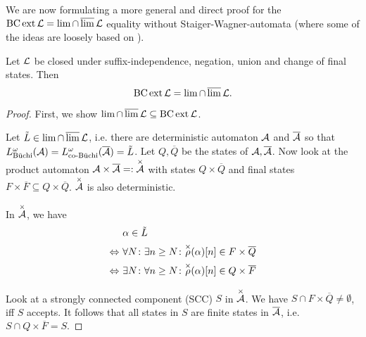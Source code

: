 We are now formulating a more general and direct proof for the $\operatorname{BC} \operatorname{ext} \mathcal{L} = \lim \cap \operatorname{\overline{lim}} \mathcal{L}$ equality without Staiger-Wagner-automata (where some of the ideas are loosely based on \cite[Theorem 63+64, p.44]{InfCompR101}).

\begin{lemma}
\label{gen:staiger-wagner}
Let $\mathcal{L}$ be closed under suffix-independence, negation, union and change of final states. Then
\[ \operatorname{BC} \operatorname{ext} \mathcal{L} = \lim \cap \operatorname{\overline{lim}} \mathcal{L} . \]

\begin{proof}
First, we show $\lim \cap \operatorname{\overline{lim}} \mathcal{L} \subseteq \operatorname{BC} \operatorname{ext} \mathcal{L}$.

Let $\tilde L \in \lim \cap \operatorname{\overline{lim}} \mathcal{L}$, i.e. there are deterministic automaton $\mathcal{A}$ and $\overline {\mathcal{A}}$ so that $L^\omega_{\text{Büchi}}(\mathcal{A}) = L^\omega_{\text{co-Büchi}}(\overline {\mathcal{A}}) = \tilde L$. Let $Q,\overline Q$ be the states of $\mathcal{A},\overline {\mathcal{A}}$. Now look at the product automaton $\mathcal{A} \times \overline {\mathcal{A}} =: \overset{\times}{\mathcal{A}}$ with states $Q \times \overline Q$ and final states $F \times \overline F \subseteq Q \times \overline Q$. $\overset{\times}{\mathcal{A}}$ is also deterministic.



In $\overset{\times}{\mathcal{A}}$, we have
\begin{align*}
& \alpha \in \tilde L \\
\Leftrightarrow \ & \forall N \colon \exists n \ge N \colon \overset{\times}{\rho}(\alpha)[n] \in F \times \overline Q \\
\Leftrightarrow \ & \exists N \colon \forall n \ge N \colon \overset{\times}{\rho}(\alpha)[n] \in Q \times \overline F
\end{align*}

Look at a strongly connected component (SCC) $S$ in $\overset{\times}{\mathcal{A}}$. We have $S \cap F \times \overline Q \neq \emptyset$, iff $S$ accepts. It follows that all states in $S$ are finite states in $\overline {\mathcal{A}}$, i.e. $S \cap Q \times \overline F = S$.


\end{proof}
\end{lemma}
